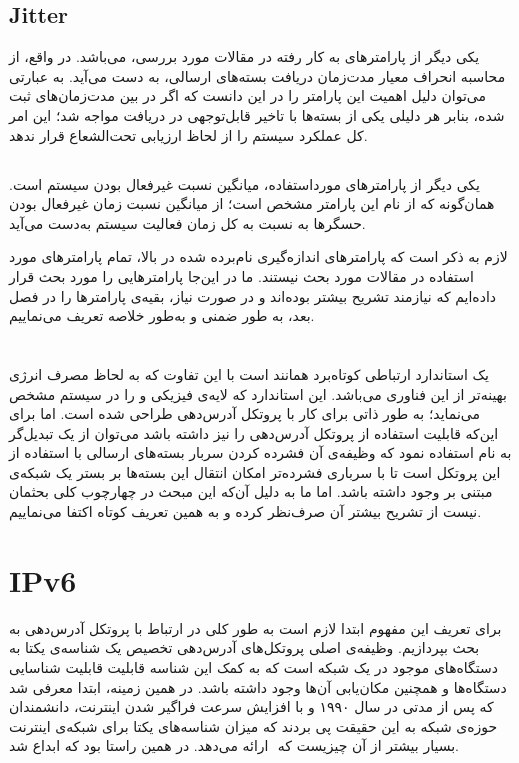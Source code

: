 \subsection{Jitter}
یکی دیگر از پارامتر‌های به کار رفته در مقالات مورد بررسی،  \cite{} می‌باشد.  در واقع، از محاسبه انحراف معیار مدت‌زمان دریافت بسته‌های ارسالی، به دست می‌آید. به عبارتی می‌توان دلیل اهمیت این پارامتر را در این دانست که اگر در بین مدت‌زمان‌های ثبت شده، بنابر هر دلیلی یکی از بسته‌ها با تاخیر قابل‌توجهی در دریافت مواجه شد؛ این امر کل عملکرد سیستم را از لحاظ ارزیابی تحت‌الشعاع قرار ندهد.

\subsection{}
یکی دیگر از پارامترهای مورداستفاده، میانگین نسبت غیرفعال بودن سیستم است. همان‌گونه که از نام این پارامتر مشخص است؛ از میانگین نسبت زمان غیرفعال بودن حسگرها به نسبت به کل زمان فعالیت سیستم به‌دست می‌آید.

\par
لازم به ذکر است که پارامتر‌های اندازه‌گیری نام‌برده شده در بالا، تمام پارامترهای مورد استفاده در مقالات مورد بحث نیستند. ما در این‌جا پارامترهایی را مورد بحث قرار داده‌ایم که نیازمند تشریح بیشتر بوده‌اند و در صورت نیاز، بقیه‌ی پارامتر‌ها را در فصل بعد، به طور ضمنی و به‌طور خلاصه تعریف می‌نماییم.

\section{}
یک استاندارد ارتباطی کوتاه‌برد همانند  است با این تفاوت که به لحاظ مصرف انرژی بهینه‌تر از این فناوری می‌باشد. این استاندارد که لایه‌ی فیزیکی و  را در سیستم مشخص می‌نماید؛ به طور ذاتی برای کار با پروتکل آدرس‌دهی  طراحی شده است. اما برای این‌که قابلیت استفاده از پروتکل آدرس‌دهی  را نیز داشته باشد می‌توان از یک تبدیل‌گر به نام
 
استفاده نمود که وظیفه‌ی آن فشرده کردن سربار بسته‌های ارسالی با استفاده از این پروتکل است تا با سرباری فشرده‌تر امکان انتقال این بسته‌ها بر بستر یک شبکه‌ی مبتنی بر  وجود داشته باشد. اما ما به دلیل آن‌که این مبحث در چهارچوب کلی بحثمان نیست از تشریح بیشتر آن صرف‌نظر کرده و به همین تعریف کوتاه اکتفا می‌نماییم.

\section{IPv6}
برای تعریف این مفهوم ابتدا لازم است به طور کلی در ارتباط با پروتکل آدرس‌دهی به بحث بپردازیم. وظیفه‌ی اصلی پروتکل‌های آدرس‌دهی تخصیص یک شناسه‌ی یکتا به دستگاه‌های موجود در یک شبکه است که به کمک این شناسه قابلیت قابلیت شناسایی دستگاه‌ها و همچنین مکان‌یابی آن‌ها وجود داشته باشد. در همین زمینه، ابتدا  معرفی شد که پس از مدتی در سال ۱۹۹۰ و با افزایش سرعت فراگیر شدن اینترنت، دانشمندان حوزه‌ی شبکه به این حقیقت پی بردند که میزان شناسه‌های یکتا برای شبکه‌ی اینترنت بسیار بیشتر از آن چیزیست که ‌ ارائه می‌دهد. در همین راستا بود که  ابداع شد.

